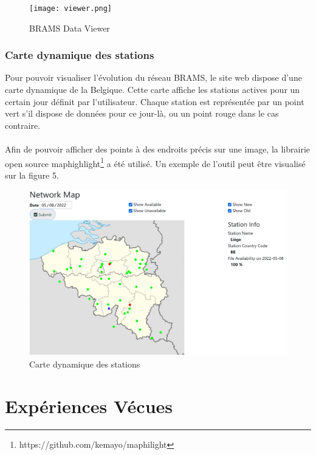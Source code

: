 \documentclass[11pt]{article}
\begin{document}
\begin{figure}[t]
    \begin{center}
        \texttt{[image: viewer.png]}
        \caption{BRAMS Data Viewer}
    \end{center}
\end{figure}

\subsubsection{Carte dynamique des stations}
Pour pouvoir visualiser l'évolution du réseau BRAMS, le site web dispose d'une carte dynamique de la Belgique.
Cette carte affiche les stations actives pour un certain jour définit par l'utilisateur.
Chaque station est représentée par un point vert s'il dispose de données pour ce jour-là, ou un point rouge dans le cas contraire.\\
\\
Afin de pouvoir afficher des points à des endroits précis sur une image, la librairie open source maphighlight\footnote{https://github.com/kemayo/maphilight} a été utilisé.
Un exemple de l'outil peut être visualisé sur la figure 5.

\begin{figure}[t]
    \begin{center}
        \includegraphics[scale=0.25]{map.png}
        \caption{Carte dynamique des stations}
    \end{center}
\end{figure}

\newpage

\section{Expériences Vécues}
\end{document}
